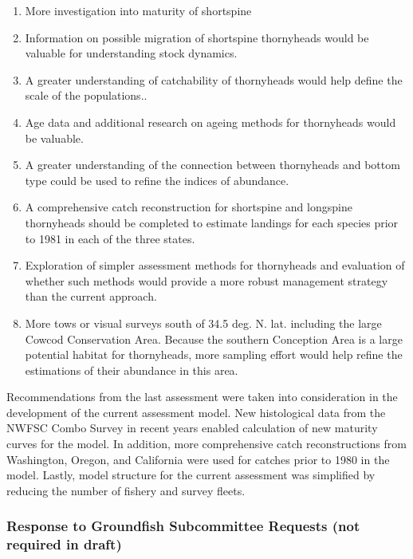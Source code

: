 \documentclass[11pt,
  english,
  letterpaper,
]{article}
\providecommand{\tightlist}{%
  \setlength{\itemsep}{0pt}\setlength{\parskip}{0pt}}
\providecommand{\tightlist}{%
  \setlength{\itemsep}{0pt}\setlength{\parskip}{0pt}}
\begin{document}
\begin{enumerate}
\def\labelenumi{\arabic{enumi}.}
\tightlist
\item
  More investigation into maturity of shortspine
\item
  Information on possible migration of shortspine thornyheads would be valuable for understanding stock dynamics.
\item
  A greater understanding of catchability of thornyheads would help define the scale of the populations..
\item
  Age data and additional research on ageing methods for thornyheads would be valuable.
\item
  A greater understanding of the connection between thornyheads and bottom type could be used to refine the indices of abundance.
\item
  A comprehensive catch reconstruction for shortspine and longspine thornyheads should be completed to estimate landings for each species prior to 1981 in each of the three states.
\item
  Exploration of simpler assessment methods for thornyheads and evaluation of whether such methods would provide a more robust management strategy than the current approach.
\item
  More tows or visual surveys south of 34.5 deg. N. lat. including the large Cowcod Conservation Area. Because the southern Conception Area is a large potential habitat for thornyheads, more sampling effort would help refine the estimations of their abundance in this area.
\end{enumerate}

Recommendations from the last assessment were taken into consideration in the development of the current assessment model. New histological data from the NWFSC Combo Survey in recent years enabled calculation of new maturity curves for the model. In addition, more comprehensive catch reconstructions from Washington, Oregon, and California were used for catches prior to 1980 in the model. Lastly, model structure for the current assessment was simplified by reducing the number of fishery and survey fleets.

\hypertarget{response-to-groundfish-subcommittee-requests-not-required-in-draft}{%
\subsubsection{Response to Groundfish Subcommittee Requests (not required in draft)}\label{response-to-groundfish-subcommittee-requests-not-required-in-draft}}
\end{document}
